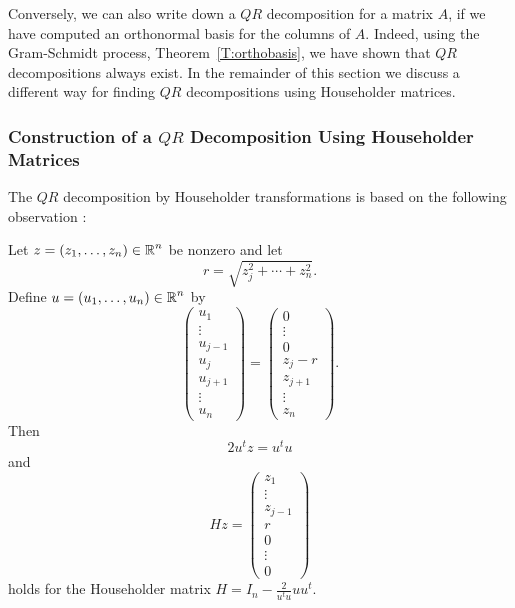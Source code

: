 \documentclass{ximera}
\begin{document}
Conversely, we can also write down a $QR$ decomposition for a matrix $A$, if
we have computed an orthonormal basis for the columns of $A$.  Indeed, using
the Gram-Schmidt process, Theorem~\ref{T:orthobasis}, we have shown that
$QR$ decompositions always exist.  In the remainder of this section we
discuss a different way for finding $QR$ decompositions using Householder
matrices.


\subsubsection*{Construction of a $QR$ Decomposition Using Householder
Matrices} 

The $QR$ decomposition by Householder transformations is based on the
following observation :

\begin{proposition} \label{prop:Housej}
Let $z=(z_1,\ldots,z_n)\in\mbox{$\Bbb{R}$}^n$ be nonzero and let
\[
r=\sqrt{z_j^2  + \cdots + z_n^2}.
\]
Define $u=(u_1,\ldots,u_n)\in\mbox{$\Bbb{R}$}^n$ by
\[
\left(\begin{array}{c}  u_1 \\ \vdots \\ u_{j-1} \\u_j \\ u_{j+1} \\ \vdots
\\ u_n \end{array}  \right)
=
\left(\begin{array}{c}  0 \\ \vdots \\ 0 \\ z_j-r \\  z_{j+1} \\ \vdots
\\ z_n \end{array}  \right).
\]
Then
\[
2u^t z = u^tu
\]
and
\begin{equation} \label{eq:Housej}
Hz = \left(\begin{array}{c} z_1\\  \vdots\\z_{j-1}\\ r \\ 0\\ \vdots\\ 0
\end{array}\right)
\end{equation}
holds for the Householder matrix $H=I_n-\frac{2}{u^tu}uu^t$.
\end{proposition}
\end{document}

